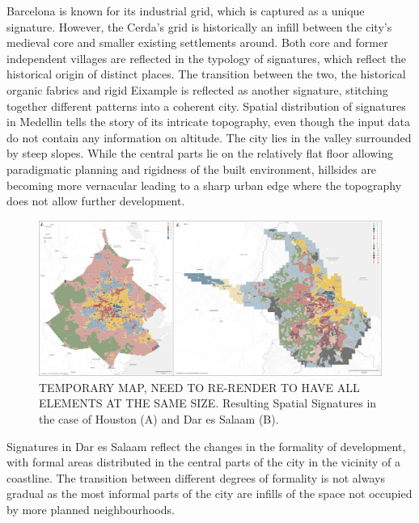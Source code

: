 Barcelona is known for its industrial grid, which is captured as a unique signature.
However, the Cerda’s grid is historically an infill between the city's medieval core and
smaller existing settlements around. Both core and former independent villages are
reflected in the typology of signatures, which reflect the historical origin of distinct
places. The transition between the two, the historical organic fabrics and rigid
Eixample is reflected as another signature, stitching together different patterns into a
coherent city.
Spatial distribution of signatures in Medellin tells the story of its intricate
topography, even though the input data do not contain any information on altitude. The
city lies in the valley surrounded by steep slopes. While the central parts lie on the
relatively flat floor allowing paradigmatic planning and rigidness of the built
environment, hillsides are becoming more vernacular leading to a sharp urban edge where
the topography does not allow further development.

\begin{figure}
    \includegraphics[width=\linewidth]{figures/maps2.png}
    \caption{TEMPORARY MAP, NEED TO RE-RENDER TO HAVE ALL ELEMENTS AT THE SAME SIZE.
    Resulting Spatial Signatures in the case of Houston (A) and Dar es Salaam (B).}
    \label{fig:maps2}
\end{figure}

Signatures in Dar es Salaam reflect the changes in the formality of development, with
formal areas distributed in the central parts of the city in the vicinity of a
coastline. The transition between different degrees of formality is not always gradual
as the most informal parts of the city are infills of the space not occupied by more
planned neighbourhoods.

